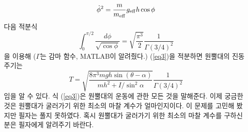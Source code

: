 \documentclass[11pt]{article}
\begin{document}
 \begin{equation} \label{eq3}
 \dot{\phi}^2=\frac{m}{m_{\rm eff}} g_{\rm eff} h \cos\phi
 \end{equation}
 다음 적분식
 \begin{equation}
 \int_{0}^{\pi/2} \frac{d\phi}{\sqrt{\cos\phi}}=\sqrt{\frac{\pi^3}{2}} \frac{1}{\Gamma(3/4)^2}
 \end{equation}
 을 이용해 ($\Gamma$는 감마 함수, MATLAB이 알려줬다.) (\ref{eq3})을 적분하면 원뿔대의 진동 주기는
 \begin{equation}
 T=\sqrt{\frac{8\pi^3 mgh \sin(\theta-\alpha)}{mh^2+I/\sin^2\alpha}}\frac{1}{\Gamma(3/4)^2}
 \end{equation}
 임을 알 수 있다. 식 (\ref{eq3})은 원뿔대의 운동에 관한 모든 것을 말해준다. 이제 궁금한 것은 원뿔대가 굴러가기 위한 최소의 마찰 계수가 얼마인지이다. 이 문제를 고민해 봤지만 필자는 풀지 못하였다. 혹시 원뿔대가 굴러가기 위한 최소의 마찰 계수를 구하신 분은 필자에게 알려주기 바란다.
\end{document}
